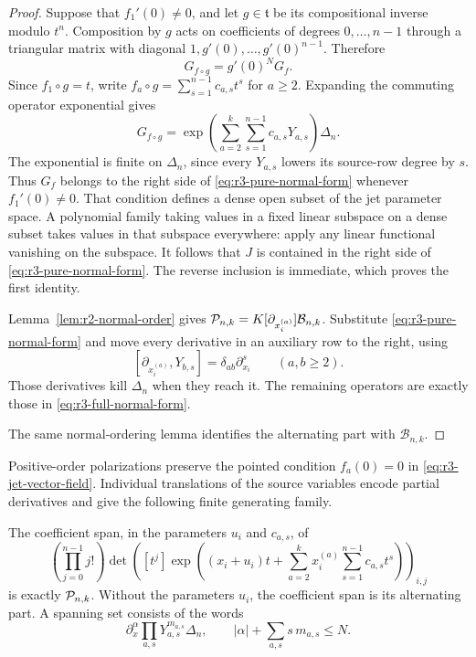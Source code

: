\begin{proof}
Suppose that $f_1'(0)\ne0$, and let $g\in\mathfrak t$ be its
compositional inverse modulo $t^n$.
Composition by $g$ acts on coefficients of degrees $0,\ldots,n-1$
through a triangular matrix with diagonal
$1,g'(0),\ldots,g'(0)^{n-1}$.  Therefore
\begin{equation}\label{eq:r3-reparametrization}
 G_{f\circ g}=g'(0)^N G_f.
\end{equation}
Since $f_1\circ g=t$, write
$f_a\circ g=\sum_{s=1}^{n-1}c_{a,s}t^s$ for $a\geq2$.
Expanding the commuting operator exponential gives
\begin{equation}\label{eq:r3-normalized-jet}
 G_{f\circ g}
   =\exp\left(\sum_{a=2}^k\sum_{s=1}^{n-1}
                       c_{a,s}Y_{a,s}\right)\Delta_n.
\end{equation}
The exponential is finite on $\Delta_n$, since every $Y_{a,s}$
lowers its source-row degree by $s$.
Thus $G_f$ belongs to the right side of
\eqref{eq:r3-pure-normal-form} whenever $f_1'(0)\ne0$.
That condition defines a dense open subset of the jet parameter
space.  A polynomial family taking values in a fixed linear
subspace on a dense subset takes values in that subspace everywhere:
apply any linear functional vanishing on the subspace.
It follows that $J$ is contained in the right side of
\eqref{eq:r3-pure-normal-form}.  The reverse inclusion is immediate,
which proves the first identity.

Lemma~\ref{lem:r2-normal-order} gives
$\mathcal P_{n,k}=K[\partial_{x_i^{(a)}}]\mathcal B_{n,k}$.
Substitute \eqref{eq:r3-pure-normal-form} and move every
derivative in an auxiliary row to the right, using
\[
 [\partial_{x_i^{(a)}},Y_{b,s}]
           =\delta_{ab}\partial_{x_i}^{s}\qquad(a,b\geq2).
\]
Those derivatives kill $\Delta_n$ when they reach it.
The remaining operators are exactly those in
\eqref{eq:r3-full-normal-form}.

The same normal-ordering lemma identifies the alternating part
with $\mathcal B_{n,k}$.
\end{proof}

Positive-order polarizations preserve the pointed condition
$f_a(0)=0$ in \eqref{eq:r3-jet-vector-field}.  Individual
translations of the source variables encode partial derivatives
and give the following finite generating family.

\begin{corollary}
\label{cor:r3-generating-determinant}
The coefficient span, in the parameters $u_i$ and $c_{a,s}$, of
\begin{equation}\label{eq:r3-generating-determinant}
 \left(\prod_{j=0}^{n-1}j!\right)
 \det\left([t^j]\exp\left((x_i+u_i)t+
         \sum_{a=2}^k x_i^{(a)}
                  \sum_{s=1}^{n-1}c_{a,s}t^s\right)\right)_{i,j}
\end{equation}
is exactly $\mathcal P_{n,k}$.
Without the parameters $u_i$, the coefficient span is its alternating
part.  A spanning set consists of the words
\[
 \partial_x^\alpha\prod_{a,s}Y_{a,s}^{m_{a,s}}\Delta_n,
 \qquad |\alpha|+\sum_{a,s}s\,m_{a,s}\leq N.
\]
\end{corollary}


